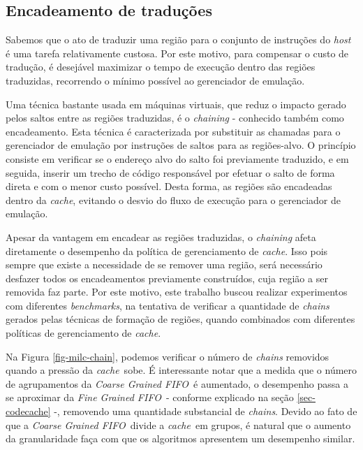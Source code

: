 \documentclass[12pt,twoside]{article}
\newcommand{\cache}{\emph{cache}}
\newcommand{\finefifo}{\emph{Fine Grained FIFO}}
\newcommand{\coarsefifo}{\emph{Coarse Grained FIFO}}
\begin{document}
\subsection{Encadeamento de traduções}
Sabemos que o ato de traduzir uma região para o conjunto de instruções do \emph{host} é uma tarefa relativamente custosa. Por este motivo, para compensar o custo de tradução, é desejável maximizar o tempo de execução dentro das regiões traduzidas, recorrendo o mínimo possível ao gerenciador de emulação.

Uma técnica bastante usada em máquinas virtuais, que reduz o impacto gerado pelos saltos entre as regiões traduzidas, é o \emph{chaining} - conhecido também como encadeamento. Esta técnica é caracterizada por substituir as chamadas para o gerenciador de emulação por instruções de saltos para as regiões-alvo. O princípio consiste em verificar se o endereço alvo do salto foi previamente traduzido, e em seguida, inserir um trecho de código
responsável por efetuar o salto de forma direta e com o menor custo possível. Desta forma, as regiões são encadeadas dentro da \cache, evitando o desvio do fluxo de execução para o gerenciador de emulação.

Apesar da vantagem em encadear as regiões traduzidas, o \emph{chaining} afeta diretamente o desempenho da política de gerenciamento de \cache. Isso pois sempre que existe a necessidade de se remover uma região, será necessário desfazer todos os encadeamentos previamente construídos, cuja região a ser removida faz parte. Por este motivo, este trabalho buscou realizar experimentos com diferentes \emph{benchmarks}, na tentativa de verificar a quantidade de \emph{chains} gerados pelas técnicas de formação de regiões, quando combinados com diferentes políticas de gerenciamento de \cache.

Na Figura \ref{fig-milc-chain}, podemos verificar o número de \emph{chains} removidos quando a pressão da \cache~sobe. É interessante notar que a medida que o número de agrupamentos da \coarsefifo~é aumentado, o desempenho passa a se aproximar da \finefifo~- conforme explicado na seção \ref{sec-codecache} -, removendo uma quantidade substancial de \emph{chains}. Devido ao fato de que a \coarsefifo~divide a \cache~em grupos, é natural que o aumento da granularidade faça com que os algoritmos apresentem um desempenho similar.
\end{document}
